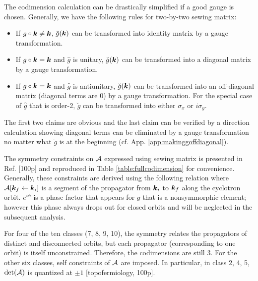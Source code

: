 \documentclass[aps, prb, showpacs, twocolumn, notitlepage, superscriptaddress]{revtex4-1}
\begin{document}
The codimension calculation can be drastically simplified if a good gauge is chosen. Generally, we have the following rules for two-by-two sewing matrix:
\begin{itemize}
\item If $g\circ\boldsymbol{k}\ne\boldsymbol{k}$, $\breve{g}(\boldsymbol{k})$ can be transformed into identity matrix by a gauge transformation.
\item If $g\circ\boldsymbol{k}=\boldsymbol{k}$ and $\hat{g}$ is unitary, $\breve{g}(\boldsymbol{k})$ can be transformed into a diagonal matrix by a gauge transformation.
\item If $g\circ\boldsymbol{k}=\boldsymbol{k}$ and $\hat{g}$ is antiunitary, $\breve{g}(\boldsymbol{k})$ can be transformed into an off-diagonal matrix (diagonal terms are 0) by a gauge transformation.  For the special case of $\hat{g}$ that is order-2, $\breve{g}$ can be transformed into either $\sigma_x$  or $i\sigma_y$.
\end{itemize}
The first two claims are obvious and the last claim can be verified by a direction calculation showing diagonal terms can be eliminated by a gauge transformation no matter what $\breve{g}$ is at the beginning (cf. App. \ref{app:makinggoffdiagonal}).

The symmetry constraints on ${\cal A}$ expressed using sewing matrix is presented in Ref. [100p] and reproduced in Table \ref{table:fullcodimension} for convenience. Generally, these constraints are derived using the following relation
where ${\cal A}[\boldsymbol{k}_f\leftarrow \boldsymbol{k}_i]$ is a segment of the propagator from $\boldsymbol{k}_i$ to $\boldsymbol{k}_f$ along the cyclotron orbit. $e^{i\phi}$ is a phase factor that appears for $g$ that is a nonsymmorphic element; however this phase always drops out\cite{100p} for closed orbits and will be neglected in the subsequent analysis.

For four of  the ten classes (7, 8, 9, 10), the symmetry relates the propagators of distinct and disconnected orbits, but each propagator (corresponding to one orbit) is itself unconstrained.  Therefore, the codimensions are still 3. For the other six classes, self constraints of ${\cal A}$ are imposed. In particular, in class 2, 4, 5, $\det({\cal A})$ is quantized at $\pm 1$ [topofermiology, 100p].
\end{document}
